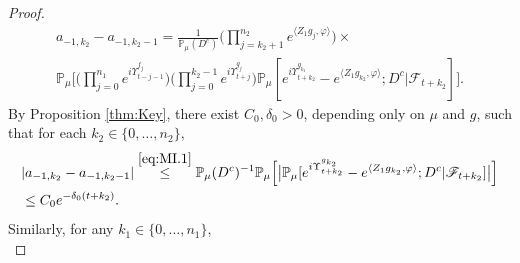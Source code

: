 \documentclass[12pt,a4paper]{amsart}
\theoremstyle{plain}
\theoremstyle{definition}
\numberwithin{equation}{section}
\begin{document}
\begin{proof}
\begin{equation}
	\label{eq:MI.1} \begin{multlined}
	 a_{-1,k_2} - a_{-1,k_2-1} = \frac{1}{\mathbb{P}_{\mu}(D^c)}  \Big(\prod_{j=k_2+1}^{n_2}e^{\langle Z_1g_j, \varphi\rangle}\Big) \times {}
	\\ \mathbb{P}_{\mu}\Big[\Big(\prod_{j=0}^{n_1}e^{i\Upsilon_{t-j-1}^{f_j}}\Big)\Big(\prod_{j=0}^{k_2-1} e^{i\Upsilon_{t+j}^{g_j}}\Big) \mathbb P_\mu[e^{i\Upsilon^{g_{k_2}}_{t+k_2}}-e^{\langle Z_1g_{k_2}, \varphi\rangle}; D^c|\mathscr F_{t+k_2}] \Big].
	\end{multlined}
\end{equation}
	By Proposition \ref{thm:Key}, there exist $C_0,\delta_0 >0$,  depending only on $\mu$ and $g$, such that  for each $k_2 \in \{0, \dots, n_2 \}$,
\begin{align}
    &| a_{-1,k_2} - a_{-1,k_2-1}|
    \overset{\eqref{eq:MI.1}}\leq \mathbb{P}_{\mu}(D^c)^{-1}\mathbb{P}_{\mu}\Big[\big|\mathbb P_\mu[e^{i\Upsilon^{g_{k_2}}_{t+k_2}}-e^{\langle Z_1g_{k_2}, \varphi\rangle}; D^c|\mathscr F_{t+k_2}]\big|\Big]    
    \\&\label{eq:MI.15} \leq C_0 e^{-\delta_0 (t+k_2)}. 
\end{align}
	Similarly, for any $k_1 \in \{0, \dots , n_1\}$,
\begin{equation}

\end{equation}
\end{proof}
\end{document}
